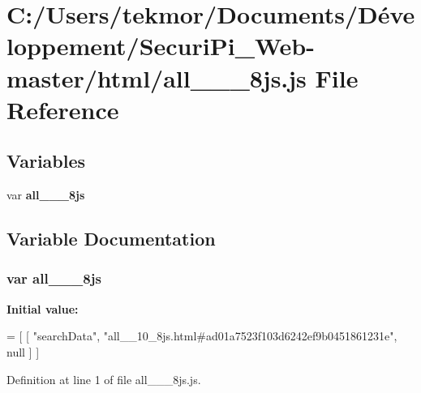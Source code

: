 \section{C\+:/\+Users/tekmor/\+Documents/\+Développement/\+Securi\+Pi\+\_\+\+Web-\/master/html/all\+\_\+\+\_\+\_\+8js.js File Reference}
\label{all____10__8js_8js}
\subsection*{Variables}
\begin{DoxyCompactItemize}
\item 
var {\bf all\+\_\+\+\_\+\_\+8js}
\end{DoxyCompactItemize}


\subsection{Variable Documentation}
\subsubsection[{all\+\_\+\+\_\+10\+\_\+8js}]{\setlength{\rightskip}{0pt plus 5cm}var all\+\_\+\+\_\+\_\+8js}\label{all____10__8js_8js_a62ee8547db3c8c4003148d312bab47eb}
{\bfseries Initial value\+:}
\begin{DoxyCode}
=
[
    [ \textcolor{stringliteral}{"searchData"}, \textcolor{stringliteral}{"all\_\_10\_8js.html#ad01a7523f103d6242ef9b0451861231e"}, null ]
]
\end{DoxyCode}


Definition at line 1 of file all\+\_\+\+\_\+\_\+8js.\+js.

